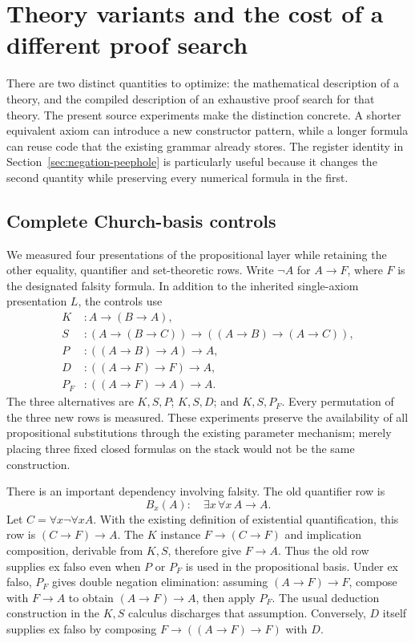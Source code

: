 \section{Theory variants and the cost of a different proof search}
\label{sec:theory-exploration}

There are two distinct quantities to optimize: the mathematical description
of a theory, and the compiled description of an exhaustive proof search for
that theory.  The present source experiments make the distinction concrete.
A shorter equivalent axiom can introduce a new constructor pattern, while
a longer formula can reuse code that the existing grammar already stores.
The register identity in Section~\ref{sec:negation-peephole} is particularly
useful because it changes the second quantity while preserving every
numerical formula in the first.

\subsection{Complete Church-basis controls}

We measured four presentations of the propositional layer while retaining
the other equality, quantifier and set-theoretic rows.  Write
$\neg A$ for $A\to F$, where $F$ is the designated falsity formula.  In
addition to the inherited single-axiom presentation $L$, the controls use
\[
\begin{aligned}
K&: A\to(B\to A),\\
S&: (A\to(B\to C))\to((A\to B)\to(A\to C)),\\
P&: ((A\to B)\to A)\to A,\\
D&: ((A\to F)\to F)\to A,\\
P_F&: ((A\to F)\to A)\to A.
\end{aligned}
\]
The three alternatives are $K,S,P$; $K,S,D$; and $K,S,P_F$.  Every permutation
of the three new rows is measured.  These experiments preserve the
availability of all propositional substitutions through the existing
parameter mechanism; merely placing three fixed closed formulas on the
stack would not be the same construction.

There is an important dependency involving falsity.  The old quantifier row
is
\[
 B_x(A):\quad \exists x\,\forall x\,A\to A.
\]
Let $C=\forall x\neg\forall x A$.  With the existing definition of
existential quantification, this row is $(C\to F)\to A$.  The $K$ instance
$F\to(C\to F)$ and implication composition, derivable from $K,S$, therefore
give $F\to A$.  Thus the old row supplies ex falso even when $P$ or $P_F$
is used in the propositional basis.  Under ex falso, $P_F$ gives double
negation elimination: assuming $(A\to F)\to F$, compose with $F\to A$ to
obtain $(A\to F)\to A$, then apply $P_F$.  The usual deduction construction
in the $K,S$ calculus discharges that assumption.  Conversely, $D$ itself
supplies ex falso by composing $F\to((A\to F)\to F)$ with $D$.

